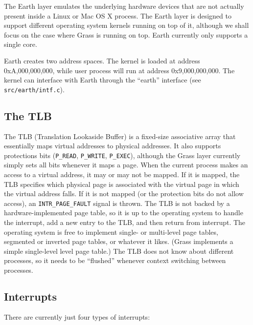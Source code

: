 \documentclass{article}
\begin{document}
The Earth layer emulates the underlying hardware devices that are not
actually present inside a Linux or Mac OS X process.  The Earth layer
is designed to support different operating system kernels running on
top of it, although we shall focus on the case where Grass is running
on top.  Earth currently only supports a single core.

Earth creates two address spaces.  The kernel is loaded at address
0xA,000,000,000, while user process will run at address
0x9,000,000,000.  The kernel can interface with Earth through
the ``earth'' interface (see \texttt{src/earth/intf.c}).

\subsection{The TLB}

The TLB (Translation Lookaside Buffer) is a fixed-size associative
array that essentially maps virtual addresses to physical addresses.
It also supports protections bits (\texttt{P\_READ}, \texttt{P\_WRITE},
\texttt{P\_EXEC}), although the Grass layer currently simply sets all
bits whenever it maps a page.
When the current process makes an access to a virtual address, it may
or may not be mapped.
If it is mapped, the TLB specifies which physical page is associated
with the virtual page in which the virtual address falls.
If it is not mapped (or the protection bits do not allow access),
an \texttt{INTR\_PAGE\_FAULT} signal is thrown.
The TLB is not backed by a hardware-implemented page table, so it is
up to the operating system to handle the interrupt, add a new entry
to the TLB, and then return from interrupt.
The operating system is free to implement single- or multi-level page
tables, segmented or inverted page tables, or whatever it likes.
(Grass implements a simple single-level level page table.)
The TLB does not know about different processes, so it needs to be
``flushed'' whenever context switching between processes.

\subsection{Interrupts}

There are currently just four types of interrupts:
\end{document}
